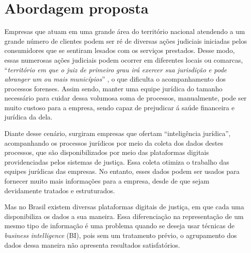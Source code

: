 \section{Abordagem proposta}

Empresas que atuam em uma grande área do território nacional atendendo a um grande número de clientes podem ser ré de diversas ações judiciais iniciadas pelos consumidores que se sentiram lesados com os serviços prestados. Desse modo, essas numerosas ações judiciais podem ocorrer em diferentes locais ou comarcas, \enquote{\textit{território em que o juiz de primeiro grau irá exercer sua jurisdição e pode abranger um ou mais municípios}} \cite{cnj:comarca}, o que dificulta o acompanhamento dos processos forenses. Assim sendo, manter uma equipe jurídica do tamanho necessário para cuidar dessa volumosa soma de processos, manualmente, pode ser muito custoso para a empresa, sendo capaz de prejudicar á saúde financeira e jurídica da dela.

Diante desse cenário, surgiram empresas que ofertam \enquote{inteligência jurídica}, acompanhando os processos jurídicos por meio da coleta dos dados destes processos, que são disponibilizados por meio das plataformas digitais providenciadas pelos sistemas de justiça. Essa coleta otimiza o trabalho das equipes jurídicas das empresas. No entanto, esses dados podem ser usados para fornecer muito mais informações para a empresa, desde de que sejam devidamente tratados e estruturados.

Mas no Brasil existem diversas plataformas digitais de justiça, em que cada uma disponibiliza os dados a sua maneira. Essa diferenciação na representação de um mesmo tipo de informação é uma problema quando se deseja usar técnicas de \textit{business intelligence} (BI), pois sem um tratamento prévio, o agrupamento dos dados dessa maneira não apresenta resultados satisfatórios.